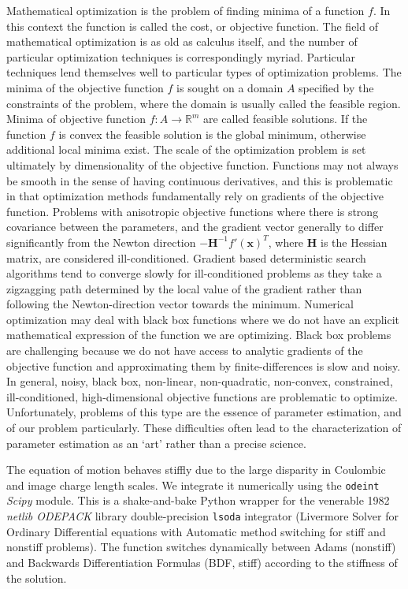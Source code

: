 \documentclass[12pt,a4paper,oneside]{book}
\begin{document}
Mathematical optimization is the problem of finding minima of a function $f$. In this context the function is called the cost, or objective function. The field of mathematical optimization is as old as calculus itself, and the number of particular optimization techniques is correspondingly myriad. Particular techniques lend themselves well to particular types of optimization problems. The minima of the objective function $f$ is sought on a domain $A$ specified by the constraints of the problem, where the domain is usually called the feasible region. Minima of objective function $f: A \rightarrow \mathbb{R}^m$ are called feasible solutions. If the function $f$ is convex the feasible solution is the global minimum, otherwise additional local minima exist. The scale of the optimization problem is set ultimately by dimensionality of the objective function. Functions may not always be smooth in the sense of having continuous derivatives, and this is problematic in that optimization methods fundamentally rely on gradients of the objective function. Problems with anisotropic objective functions where there is strong covariance between the parameters, and the gradient vector generally to differ significantly from the Newton direction $-\mathbf{H}^{-1} f' ( \mathbf{x} )^T$, where $\mathbf{H}$ is the Hessian matrix, are considered ill-conditioned. Gradient based deterministic search algorithms tend to converge slowly for ill-conditioned problems as they take a zigzagging path determined by the local value of the gradient rather than following the Newton-direction vector towards the minimum. Numerical optimization may deal with black box functions where we do not have an explicit mathematical expression of the function we are optimizing. Black box problems are challenging because we do not have access to analytic gradients of the objective function and approximating them by finite-differences is slow and noisy. In general, noisy, black box, non-linear, non-quadratic, non-convex, constrained, ill-conditioned, high-dimensional objective functions are problematic to optimize. Unfortunately, problems of this type are the essence of parameter estimation, and of our problem particularly. These difficulties often lead to the characterization of parameter estimation as an `art' rather than a precise science.   

The equation of motion behaves stiffly due to the large disparity in Coulombic and image charge length scales. We integrate it numerically using the \verb|odeint| \emph{Scipy} module. This is a shake-and-bake Python wrapper for the venerable 1982 \emph{netlib ODEPACK} library double-precision \verb|lsoda| integrator\cite{hindmarsh_odepack_1983} (Livermore Solver for Ordinary Differential equations with Automatic method switching for stiff and nonstiff problems). The function switches dynamically between Adams (nonstiff) and Backwards Differentiation Formulas (BDF, stiff) according to the stiffness of the solution.
\end{document}
